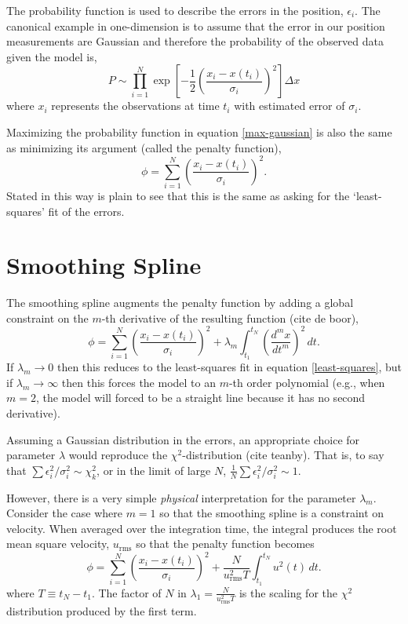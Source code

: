 \documentclass[twocol]{ametsoc}
\begin{document}
The probability function is used to describe the errors in the position, $\epsilon_i$. The canonical example in one-dimension is to assume that the error in our position measurements are Gaussian and therefore the probability of the observed data given the model is,
\begin{equation}
\label{max-gaussian}
P \sim \prod_{i=1}^{N}  \exp \left[ -\frac{1}{2} \left( \frac{x_i - x(t_i)}{\sigma_i} \right)^2 \right] \Delta x
\end{equation}
where $x_i$ represents the observations at time $t_i$ with estimated error of $\sigma_i$.

Maximizing the probability function in equation \ref{max-gaussian} is also the same as minimizing its argument (called the penalty function),
\begin{equation}
\label{least-squares}
\phi =\sum_{i=1}^{N} \left( \frac{x_i - x(t_i)}{\sigma_i} \right)^2 .
\end{equation}
Stated in this way is plain to see that this is the same as asking for the `least-squares' fit of the errors.

%
\section{Smoothing Spline}
%

The smoothing spline augments the penalty function by adding a global constraint on the $m$-th derivative of the resulting function (cite de boor),
\begin{equation}
\label{smoothing-spline}
\phi =  \sum_{i=1}^{N} \left( \frac{x_i - x(t_i)}{\sigma_i} \right) ^2 + \lambda_m \int_{t_1}^{t_N} \left(\frac{d^m x}{dt^m}\right)^2 \, dt.
\end{equation}
If $\lambda_m \rightarrow 0$ then this reduces to the least-squares fit in equation \ref{least-squares}, but if $\lambda_m \rightarrow \infty$ then this forces the model to an $m$-th order polynomial (e.g., when $m=2$, the model will forced to be a straight line because it has no second derivative). 

Assuming a Gaussian distribution in the errors, an appropriate choice for parameter $\lambda$ would reproduce the $\chi^2$-distribution (cite teanby). That is, to say that $\sum \epsilon_i^2/\sigma_i^2 \sim \chi^2_k$, or in the limit of large $N$,  $\frac{1}{N} \sum \epsilon_i^2/\sigma_i^2 \sim 1$.

However, there is a very simple \emph{physical} interpretation for the parameter $\lambda_m$. Consider the case where $m=1$ so that the smoothing spline is a constraint on velocity. When averaged over the integration time, the integral produces the root mean square velocity, $u_{\textrm{rms}}$ so that the penalty function becomes
\begin{equation}
\label{smoothing-spline-velocity}
\phi =  \sum_{i=1}^{N} \left( \frac{x_i - x(t_i)}{\sigma_i} \right) ^2 + \frac{N}{u_{\textrm{rms}}^2 T} \int_{t_1}^{t_N} u^2(t) \, dt.
\end{equation}
where $T\equiv t_N-t_1$. The factor of $N$ in $\lambda_1 =  \frac{N}{u_{\textrm{rms}}^2 T}$ is the scaling for the $\chi^2$ distribution produced by the first term.
\end{document}
